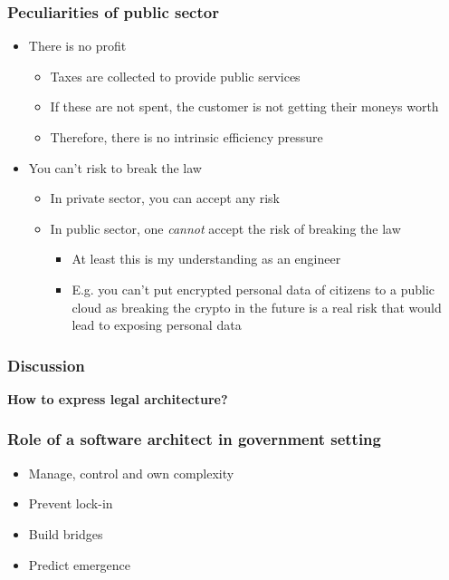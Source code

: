 \documentclass[10pt, compress]{beamer}
\begin{document}
\begin{frame}[fragile]
	\frametitle{Peculiarities of public sector}
	\begin{itemize}
		\item There is no profit
		\begin{itemize}
			\item Taxes are collected to provide public services
			\item If these are not spent, the customer is not getting their moneys worth
			\item Therefore, there is no intrinsic efficiency pressure
		\end{itemize}
		\item You can't risk to break the law
		\begin{itemize}
			\item In private sector, you can accept any risk 
			\item In public sector, one \emph{cannot} accept the risk of breaking the law
			\begin{itemize}
				\item At least this is my understanding as an engineer
				\item E.g. you can't put encrypted personal data of citizens to a public cloud as breaking the crypto in the future is a real risk that would lead to exposing personal data
			\end{itemize} 
		\end{itemize}
	\end{itemize}
\end{frame}

\begin{frame}[fragile]
  \frametitle{Discussion}
		\begin{center}
			\textbf{How to express legal architecture?}
		\end{center}
\end{frame}


\begin{frame}[fragile]
  \frametitle{Role of a software architect in government setting}
  	\begin{itemize}
		\item Manage, control and own complexity
		\item Prevent lock-in
		\item Build bridges
		\item Predict emergence
	\end{itemize}
\end{frame}
\end{document}
